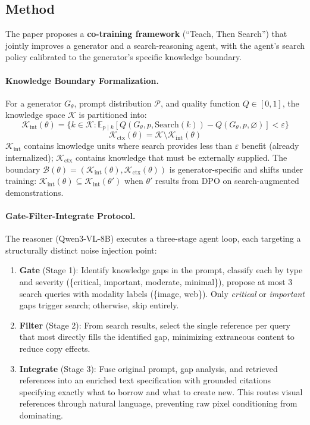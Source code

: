 \documentclass[11pt,a4paper]{article}
\begin{document}
\subsection{Method}

The paper proposes a \textbf{co-training framework} (``Teach, Then Search'') that jointly improves a generator and a search-reasoning agent, with the agent's search policy calibrated to the generator's specific knowledge boundary.

\paragraph{Knowledge Boundary Formalization.} For a generator $G_\theta$, prompt distribution $\mathcal{P}$, and quality function $Q \in [0,1]$, the knowledge space $\mathcal{K}$ is partitioned into:
\[
\mathcal{K}_{\mathrm{int}}(\theta) = \{k \in \mathcal{K} : \mathbb{E}_{p \mid k}[Q(G_\theta, p, \mathrm{Search}(k)) - Q(G_\theta, p, \varnothing)] < \varepsilon\}
\]
\[
\mathcal{K}_{\mathrm{ctx}}(\theta) = \mathcal{K} \setminus \mathcal{K}_{\mathrm{int}}(\theta)
\]
$\mathcal{K}_{\mathrm{int}}$ contains knowledge units where search provides less than $\varepsilon$ benefit (already internalized); $\mathcal{K}_{\mathrm{ctx}}$ contains knowledge that must be externally supplied. The boundary $\mathcal{B}(\theta) = (\mathcal{K}_{\mathrm{int}}(\theta), \mathcal{K}_{\mathrm{ctx}}(\theta))$ is generator-specific and shifts under training: $\mathcal{K}_{\mathrm{int}}(\theta) \subseteq \mathcal{K}_{\mathrm{int}}(\theta')$ when $\theta'$ results from DPO on search-augmented demonstrations.

\paragraph{Gate-Filter-Integrate Protocol.} The reasoner (Qwen3-VL-8B) executes a three-stage agent loop, each targeting a structurally distinct noise injection point:
\begin{enumerate}
\item \textbf{Gate} (Stage 1): Identify knowledge gaps in the prompt, classify each by type and severity (\{critical, important, moderate, minimal\}), propose at most 3 search queries with modality labels (\{image, web\}). Only \emph{critical} or \emph{important} gaps trigger search; otherwise, skip entirely.
\item \textbf{Filter} (Stage 2): From search results, select the single reference per query that most directly fills the identified gap, minimizing extraneous content to reduce copy effects.
\item \textbf{Integrate} (Stage 3): Fuse original prompt, gap analysis, and retrieved references into an enriched text specification with grounded citations specifying exactly what to borrow and what to create new. This routes visual references through natural language, preventing raw pixel conditioning from dominating.
\end{enumerate}
\end{document}

